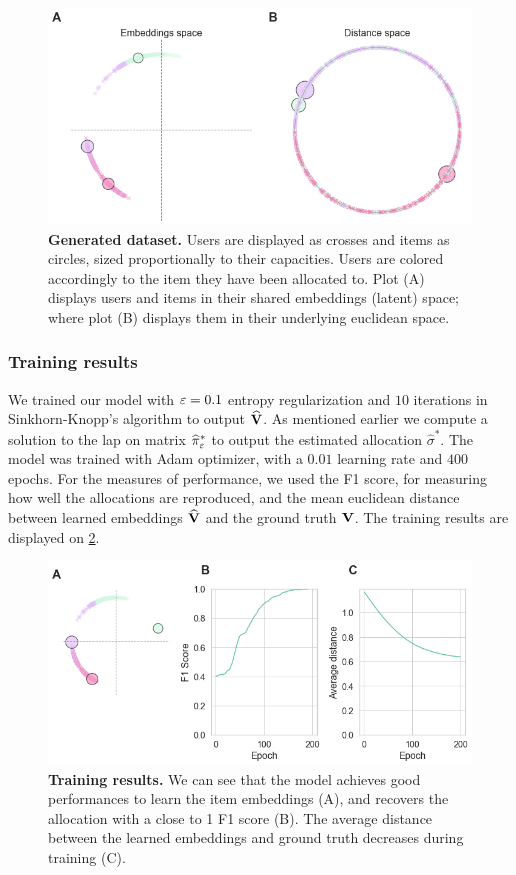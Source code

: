 \begin{figure}[h]
    \centering
    \includegraphics[width=.9\columnwidth]{images/simca/dataset.png}
    \caption{
        \textbf{Generated dataset.} Users are displayed as crosses and items as circles, sized proportionally to their capacities. Users are colored accordingly to the item they have been allocated to. Plot (A) displays users and items in their shared embeddings (latent) space; where plot (B) displays them in their underlying euclidean space.
    }
    \label{fig:toy_dataset}
\end{figure}

\subsubsection*{Training results}
We trained our model with $\varepsilon=0.1$ entropy regularization and $10$ iterations in Sinkhorn-Knopp's algorithm to output $\widehat{\mathbf{V}}$. As mentioned earlier we compute a solution to the \ac{lap} on matrix $\widehat{\pi}^*_{\varepsilon}$ to output the estimated allocation $\widehat{\sigma}^*$. The model was trained with Adam optimizer, with a $0.01$ learning rate and $400$ epochs. For the measures of performance, we used the F1 score, for measuring how well the allocations are reproduced, and the mean euclidean distance between learned embeddings $\widehat{\mathbf{V}}$ and the ground truth $\mathbf{V}$. The training results are displayed on \cref{fig:learned_embeddings}.

\begin{figure}[h]
    \centering
    \includegraphics[width=.9\columnwidth]{images/simca/learned_embeddings.png}
    \caption{
        \textbf{Training results.} We can see that the model achieves good performances to learn the item embeddings (A), and recovers the allocation with a close to 1 F1 score (B). The average distance between the learned embeddings and ground truth decreases during training (C).
    }
    \label{fig:learned_embeddings}
\end{figure}

